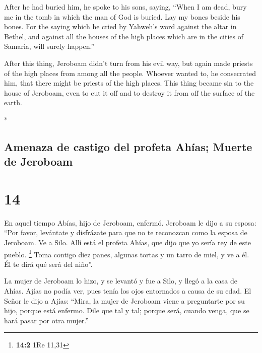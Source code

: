 \begin{paracol}{2}
\begin{otherlanguage}{english}
 After he had buried him, he spoke to his sons, saying,
``When I am dead, bury me in the tomb in which the man of God is buried.
Lay my bones beside his bones.  For the saying which he
cried by Yahweh's word against the altar in Bethel, and against all the
houses of the high places which are in the cities of Samaria, will
surely happen.''

 After this thing, Jeroboam didn't turn from his evil
way, but again made priests of the high places from among all the
people. Whoever wanted to, he consecrated him, that there might be
priests of the high places.  This thing became sin to the
house of Jeroboam, even to cut it off and to destroy it from off the
surface of the earth.

\end{otherlanguage}

\switchcolumn[0]*

\hypertarget{amenaza-de-castigo-del-profeta-ahuxedas-muerte-de-jeroboam}{%
\subsection{Amenaza de castigo del profeta Ahías; Muerte de
Jeroboam}\label{amenaza-de-castigo-del-profeta-ahuxedas-muerte-de-jeroboam}}

\hypertarget{section-26}{%
\section{14}\label{section-26}}

 En aquel tiempo Abías, hijo de Jeroboam, enfermó.
 Jeroboam le dijo a su esposa: ``Por favor, levántate y
disfrázate para que no te reconozcan como la esposa de Jeroboam. Ve a
Silo. Allí está el profeta Ahías, que dijo que yo sería rey de este
pueblo. \footnote{\textbf{14:2} 1Re 11,31}  Toma contigo
diez panes, algunas tortas y un tarro de miel, y ve a él. Él te dirá qué
será del niño''.

 La mujer de Jeroboam lo hizo, y se levantó y fue a Silo,
y llegó a la casa de Ahías. Ajías no podía ver, pues tenía los ojos
entornados a causa de su edad.  El Señor le dijo a Ajías:
``Mira, la mujer de Jeroboam viene a preguntarte por su hijo, porque
está enfermo. Dile que tal y tal; porque será, cuando venga, que se hará
pasar por otra mujer.''

\hypertarget{discurso-de-castigo-y-amenaza-de-ahuxedas-contra-jeroboam}{%
}
\end{paracol}
